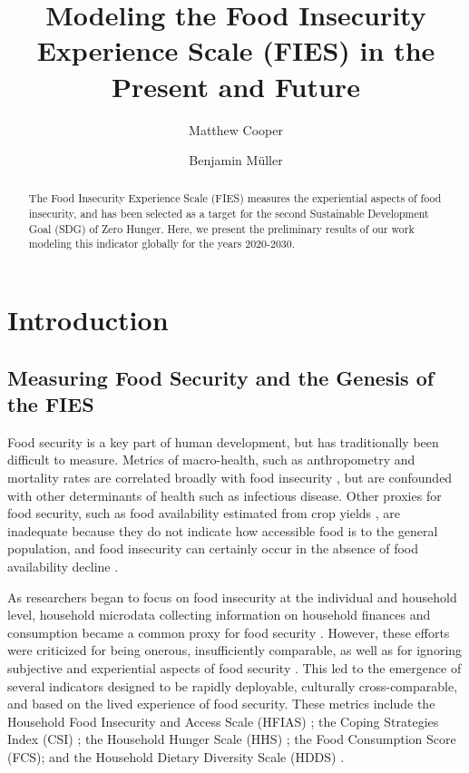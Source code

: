 \documentclass{article}
\begin{document}
\title{Modeling the Food Insecurity Experience Scale (FIES) in the Present and Future}

\author[1]{Matthew Cooper}
\author[2]{Benjamin Müller}


\maketitle
\begin{abstract}
The Food Insecurity Experience Scale (FIES) measures the experiential aspects of food insecurity, and has been selected as a target for the second Sustainable Development Goal (SDG) of Zero Hunger.  Here, we present the preliminary results of our work modeling this indicator globally for the years 2020-2030.

\end{abstract}

\section{Introduction}

\subsection{Measuring Food Security and the Genesis of the FIES}
Food security is a key part of human development, but has traditionally been difficult to measure.  Metrics of macro-health, such as anthropometry and mortality rates are correlated broadly with food insecurity \cite{Puffer1973, Habicht1974}, but are confounded with other determinants of health such as infectious disease.  Other proxies for food security, such as food availability estimated from crop yields \cite{Maxwell1992}, are inadequate because they do not indicate how accessible food is to the general population, and food insecurity can certainly occur in the absence of food availability decline \cite{Sen1983}.

As researchers began to focus on food insecurity at the individual and household level, household microdata collecting information on household finances and consumption became a common proxy for food security \cite{Haddad1994}.  However, these efforts were criticized for being onerous, insufficiently comparable, as well as for ignoring subjective and experiential aspects of food security \cite{Maxwell1996}.  This led to the emergence of several indicators designed to be rapidly deployable, culturally cross-comparable, and based on the lived experience of food security.  These metrics include the Household Food Insecurity and Access Scale (HFIAS) \cite{Coates2007}; the Coping Strategies Index (CSI) \cite{Maxwell1999}; the Household Hunger Scale (HHS) \cite{Ballard2011}; the Food Consumption Score (FCS); and the Household Dietary Diversity Scale (HDDS) \cite{Kennedy2010}.
\end{document}
